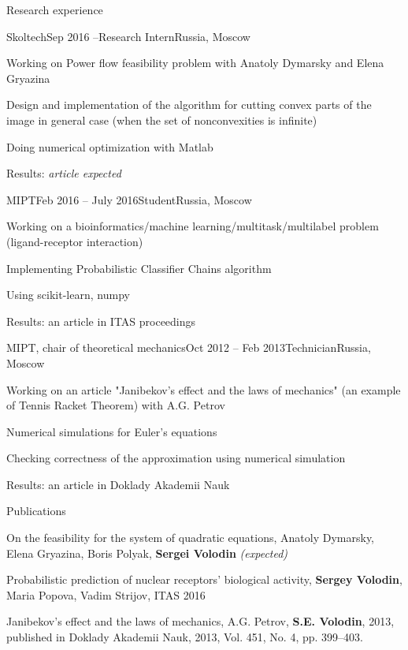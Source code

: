 \documentclass{resume} %
\begin{document}
\begin{rSection}{Research experience}
	\begin{rSubsection}{Skoltech}{Sep 2016 --}{Research Intern}{Russia, Moscow}
		\item Working on Power flow feasibility problem with Anatoly Dymarsky and Elena Gryazina
		\item Design and implementation of the algorithm for cutting convex parts of the image in general case (when the set of nonconvexities is infinite)
		\item Doing numerical optimization with Matlab
		\item Results: \em article expected
	\end{rSubsection}
	
	\begin{rSubsection}{MIPT}{Feb 2016 -- July 2016}{Student}{Russia, Moscow}
		\item Working on a bioinformatics/machine learning/multitask/multilabel problem\\ (ligand-receptor interaction)
		\item Implementing Probabilistic Classifier Chains algorithm
		\item Using scikit-learn, numpy
		\item Results: an article in ITAS proceedings
	\end{rSubsection}
	
	\begin{rSubsection}{MIPT, chair of theoretical mechanics}{Oct 2012 -- Feb 2013}{Technician}{Russia, Moscow}
		\item Working on an article "Janibekov's effect and the laws of mechanics" (an example of Tennis Racket Theorem) with A.G. Petrov
		\item Numerical simulations for Euler's equations
		\item Checking correctness of the approximation using numerical simulation
		\item Results: an article in Doklady Akademii Nauk
	\end{rSubsection}
\end{rSection}


\begin{rSection}{Publications}
\item On the feasibility for the system of quadratic equations, Anatoly Dymarsky, Elena Gryazina, Boris Polyak, {\bf Sergei Volodin} {\em (expected)}
\item Probabilistic prediction of nuclear receptors’ biological activity, {\bf Sergey Volodin}, Maria Popova, Vadim Strijov, ITAS 2016
\item Janibekov’s effect and the laws of mechanics, A.G. Petrov, {\bf S.E. Volodin}, 2013, published in Doklady Akademii Nauk, 2013, Vol. 451, No. 4, pp. 399–403.
\end{rSection}
\end{document}
